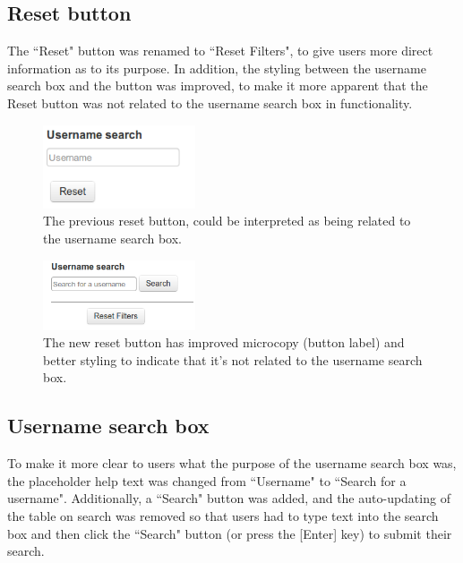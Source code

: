 \subsection{Reset button}
The ``Reset" button was renamed to ``Reset Filters", to give users more direct information \citep[p. 520]{Galitz} as to its purpose. In addition, the styling between the username search box and the button was improved, to make it more apparent that the Reset button was not related to the username search box in functionality. 
\begin{figure}[h!]
    \centering
    \includegraphics[width=0.4\textwidth]{Figures/V2/oldreset.png}
 \caption{The previous reset button, could be interpreted as being related to the username search box.}
\end{figure}

\begin{figure}[h!]
    \centering
    \includegraphics[width=0.4\textwidth]{Figures/V2/newreset.png}
 \caption{The new reset button has improved microcopy (button label) and better styling to indicate that it's not related to the username search box.}
\end{figure}


\subsection{Username search box}
To make it more clear to users what the purpose of the username search box was, the placeholder help text was changed from ``Username" to ``Search for a username". Additionally, a ``Search" button was added, and the auto-updating of the table on search was removed so that users had to type text into the search box and then click the ``Search" button (or press the [Enter] key) to submit their search. 

